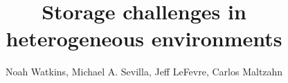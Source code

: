 \documentclass{sig-alternate}
\begin{document}

\toappear{}




%

\title{Storage challenges in heterogeneous environments}

%
%
%
%
%

%
\author{
%
%
\alignauthor
Noah Watkins, Michael A. Sevilla, Jeff LeFevre, Carlos Maltzahn \\
 \\
}
\end{document}
